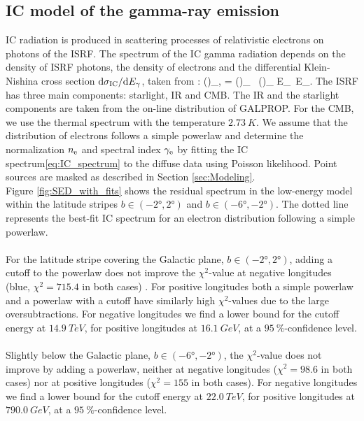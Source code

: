 \subsection{IC model of the gamma-ray emission}
\label{sec:IC_model}

IC radiation is produced in scattering processes of relativistic electrons on photons of the ISRF. The spectrum of the IC gamma radiation depends on the density of ISRF photons, the density of electrons and the differential Klein-Nishina cross section $\text{d} \sigma_{\text{IC}} / \text{d} E_\gamma$, taken from \citep{1970RvMP...42..237B}:
\be
\left(\right)_{\!\!\gamma,\IC}\! = \int\!\! \int \left(\right)_{\!\!\ISRF} \ \left(\right)_{\!\!\el} \de E_\ISRF\, \de E_\el.
\label{eq:IC_spectrum}
\ee
The ISRF has three main components: starlight, IR and CMB. 
The IR and the starlight components are taken from the on-line distribution of GALPROP. 
For the CMB, we use the thermal spectrum with the temperature $\SI{2.73}{K}$. 
We assume that the distribution of electrons follows  a simple powerlaw
and determine the normalization $n_{\text{e}}$ and spectral index $\gamma_{\text{e}}$  by fitting the IC spectrum\eqref{eq:IC_spectrum} to the diffuse \Fermi data using Poisson likelihood.  Point sources are masked as described in Section \ref{sec:Modeling}.\\
Figure \ref{fig:SED_with_fits} shows the residual spectrum in the low-energy model within the latitude stripes $b \in (-\ang{2}, \ang{2})$ and $b \in (-\ang{6}, -\ang{2})$. The dotted line represents the best-fit IC spectrum for an electron distribution following a simple powerlaw. \\
\\
For the latitude stripe covering the Galactic plane, $b \in (-\ang{2}, \ang{2})$, adding a cutoff to the powerlaw does not improve the $\chi^2$-value at negative longitudes (blue, $\chi^2 = 715.4$ in both cases) . For positive longitudes both a simple powerlaw and a powerlaw with a cutoff have similarly high $\chi^2$-values due to the large oversubtractions. For negative longitudes we find a lower bound for the cutoff energy at $\SI{14.9}{TeV}$, for positive longitudes at $\SI{16.1}{GeV}$, at a $\SI{95}{\percent}$-confidence level.\\
\\
Slightly below the Galactic plane, $b \in (-\ang{6}, -\ang{2})$, the $\chi^2$-value does not improve by adding a powerlaw, neither at negative longitudes ($\chi^2 = 98.6$ in both cases) nor at positive longitudes ($\chi^2 = 155$ in both cases). For negative longitudes we find a lower bound for the cutoff energy at $\SI{22.0}{TeV}$, for positive longitudes at $\SI{790.0}{GeV}$, at a $\SI{95}{\percent}$-confidence level.\\
\\

